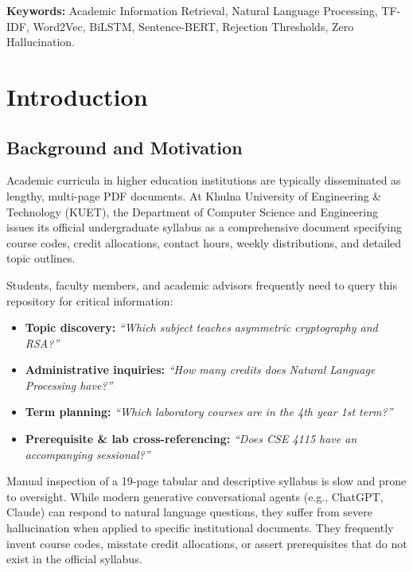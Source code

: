 \documentclass[12pt,a4paper]{report}
\begin{document}
\vspace{1cm}
\noindent\textbf{Keywords:} Academic Information Retrieval, Natural Language Processing, TF-IDF, Word2Vec, BiLSTM, Sentence-BERT, Rejection Thresholds, Zero Hallucination.

\newpage
\tableofcontents
\listoffigures
\listoftables

\clearpage
{}
\chapter{Introduction}

\section{Background and Motivation}
Academic curricula in higher education institutions are typically disseminated as lengthy, multi-page PDF documents. At Khulna University of Engineering \& Technology (KUET), the Department of Computer Science and Engineering issues its official undergraduate syllabus as a comprehensive document specifying course codes, credit allocations, contact hours, weekly distributions, and detailed topic outlines.

Students, faculty members, and academic advisors frequently need to query this repository for critical information:
\begin{itemize}
    \item \textbf{Topic discovery:} \textit{``Which subject teaches asymmetric cryptography and RSA?''}
    \item \textbf{Administrative inquiries:} \textit{``How many credits does Natural Language Processing have?''}
    \item \textbf{Term planning:} \textit{``Which laboratory courses are in the 4th year 1st term?''}
    \item \textbf{Prerequisite \& lab cross-referencing:} \textit{``Does CSE 4115 have an accompanying sessional?''}
\end{itemize}

Manual inspection of a 19-page tabular and descriptive syllabus is slow and prone to oversight. While modern generative conversational agents (e.g., ChatGPT, Claude) can respond to natural language questions, they suffer from severe hallucination when applied to specific institutional documents. They frequently invent course codes, misstate credit allocations, or assert prerequisites that do not exist in the official syllabus. 
\end{document}
